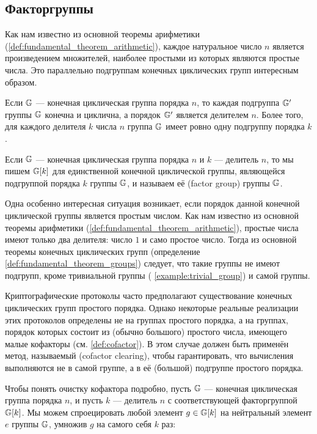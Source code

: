 \subsection{Факторгруппы}
Как нам известно из основной теоремы арифметики (\ref{def:fundamental_theorem_arithmetic}), каждое натуральное число $n$ является произведением множителей, наиболее простыми из которых являются простые числа. Это параллельно подгруппам конечных циклических групп интересным образом.

\begin{definition}\label{def:fundamental_theorem_groups}
Если $\mathbb{G}$ — конечная циклическая группа порядка $n$, то каждая подгруппа $\mathbb{G}'$ группы $\mathbb{G}$ конечна и циклична, а порядок $\mathbb{G}'$ является делителем $n$. Более того, для каждого делителя $k$ числа $n$ группа $\mathbb{G}$ имеет ровно одну подгруппу порядка $k$.
\end{definition}

\begin{notation}Если $\mathbb{G}$ — конечная циклическая группа порядка $n$ и $k$ — делитель $n$, то мы пишем $\mathbb{G}[k]$ для единственной конечной циклической группы, являющейся подгруппой порядка $k$ группы $\mathbb{G}$, и называем её  (factor group) группы $\mathbb{G}$.
\end{notation}

Одна особенно интересная ситуация возникает, если порядок данной конечной циклической группы является простым числом. Как нам известно из основной теоремы арифметики (\ref{def:fundamental_theorem_arithmetic}), простые числа имеют только два делителя: число $1$ и само простое число. Тогда из основной теоремы конечных циклических групп (определение \ref{def:fundamental_theorem_groups}) следует, что такие группы не имеют подгрупп, кроме тривиальной группы (\examplename{} \ref{example:trivial_group}) и самой группы.

Криптографические протоколы часто предполагают существование конечных циклических групп простого порядка. Однако некоторые реальные реализации этих протоколов определены не на группах простого порядка, а на группах, порядок которых состоит из (обычно большого) простого числа, имеющего малые кофакторы (см. \notationname{} \ref{def:cofactor}). В этом случае должен быть применён метод, называемый  (cofactor clearing), чтобы гарантировать, что вычисления выполняются не в самой группе, а в её (большой) подгруппе простого порядка.

Чтобы понять очистку кофактора подробно, пусть $\mathbb{G}$ — конечная циклическая группа порядка $n$, и пусть $k$ — делитель $n$ с соответствующей факторгруппой $\mathbb{G}[k]$. Мы можем спроецировать любой элемент $g\in\mathbb{G}[k]$ на нейтральный элемент $e$ группы $\mathbb{G}$, умножив $g$ на самого себя $k$ раз:

